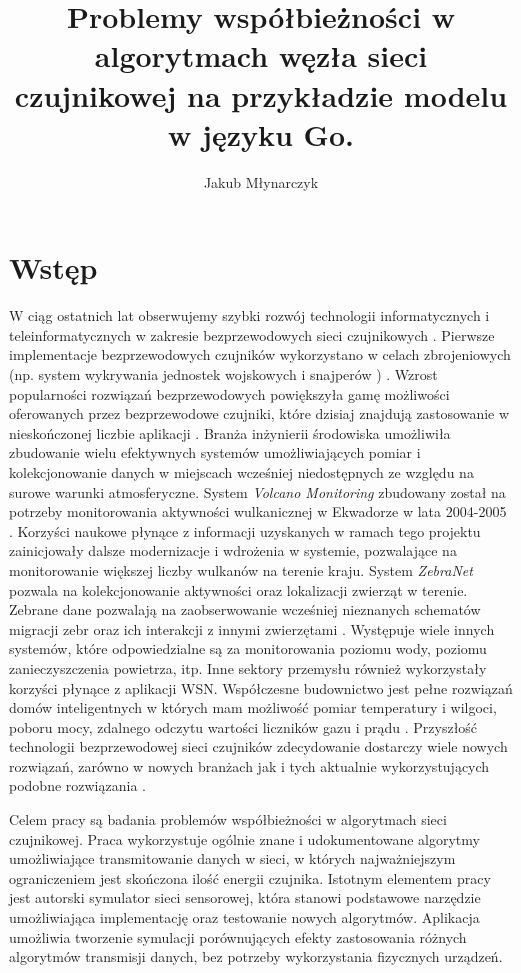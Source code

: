 \documentclass[a4paper,12pt,twoside,openany]{report}
\title{Problemy współbieżności w algorytmach węzła sieci czujnikowej na przykładzie modelu w języku Go.}
\author{Jakub Młynarczyk}
\begin{document}
\maketitle

\chapter{Wstęp}

W ciąg ostatnich lat obserwujemy szybki rozwój technologii informatycznych i teleinformatycznych w zakresie bezprzewodowych sieci czujnikowych \cite{WsnOpis-Chong}.
Pierwsze implementacje bezprzewodowych czujników wykorzystano w celach zbrojeniowych (np. system wykrywania jednostek wojskowych i snajperów ) \cite{Akyildiz}. 
Wzrost popularności rozwiązań bezprzewodowych powiększyła gamę możliwości oferowanych przez bezprzewodowe czujniki, które dzisiaj znajdują zastosowanie w nieskończonej liczbie aplikacji \cite{ACM-WSN}. 
Branża inżynierii środowiska umożliwiła zbudowanie wielu efektywnych systemów umożliwiających pomiar i kolekcjonowanie danych w miejscach wcześniej niedostępnych ze względu na surowe warunki atmosferyczne.
System \textit{Volcano Monitoring} zbudowany został na potrzeby monitorowania aktywności wulkanicznej w Ekwadorze w lata 2004-2005 \cite{volcano}. Korzyści naukowe płynące z informacji uzyskanych w ramach tego projektu zainicjowały dalsze
modernizacje i wdrożenia w systemie, pozwalające na monitorowanie większej liczby wulkanów na terenie kraju.
System \textit{ZebraNet} pozwala na kolekcjonowanie aktywności oraz lokalizacji zwierząt w terenie. Zebrane dane pozwalają na zaobserwowanie wcześniej nieznanych schematów migracji zebr oraz ich interakcji z innymi zwierzętami \cite{zebranet}. 
Występuje wiele innych systemów, które odpowiedzialne są za monitorowania poziomu wody, poziomu zanieczyszczenia powietrza, itp. \cite{Akyildiz} \cite{Shen}
Inne sektory przemysłu również wykorzystały korzyści płynące z aplikacji WSN. Współczesne budownictwo jest pełne rozwiązań domów inteligentnych w których mam możliwość pomiar temperatury i wilgoci, poboru mocy, zdalnego odczytu wartości liczników gazu i prądu \cite{Wiley-WSN}.
Przyszłość technologii bezprzewodowej sieci czujników zdecydowanie dostarczy wiele nowych rozwiązań, zarówno w nowych branżach jak i tych aktualnie wykorzystujących podobne rozwiązania \cite{wsn-future}.

\par
Celem pracy są badania problemów współbieżności w algorytmach sieci czujnikowej.
Praca wykorzystuje ogólnie znane i udokumentowane algorytmy umożliwiające transmitowanie danych w sieci, w których najważniejszym ograniczeniem jest skończona ilość energii czujnika.
Istotnym elementem pracy jest autorski symulator sieci sensorowej, która stanowi podstawowe narzędzie umożliwiająca implementację oraz testowanie nowych algorytmów.
Aplikacja umożliwia tworzenie symulacji porównujących efekty zastosowania różnych algorytmów transmisji danych, bez potrzeby wykorzystania fizycznych urządzeń.
\end{document}
